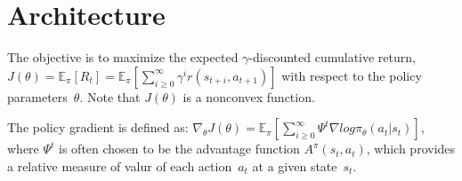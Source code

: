 \section{Architecture}


The objective is to
maximize the expected $\gamma$-discounted cumulative return,
$J(\theta) = \mathbb{E}_{\pi} [R_t] = \mathbb{E}_{\pi} [ \sum_{i \ge 0}^{\infty} \gamma^i r(s_{t+i}, a_{t+1}) ]$
with respect to the policy parameters~$\theta$.
Note that $J(\theta)$ is a nonconvex function.

The policy gradient is defined as:
$\nabla_{\theta} J(\theta) = \mathbb{E}_{\pi} [ \sum_{i \ge 0}^{\infty} \Psi^t \nabla log \pi_{\theta} (a_t | s_t) ]$,
where $\Psi^t$ is often chosen to be the advantage function $A^{\pi}(s_t,a_t)$,
which provides a relative measure of valur of each action~$a_t$ at a given state~$s_t$.

